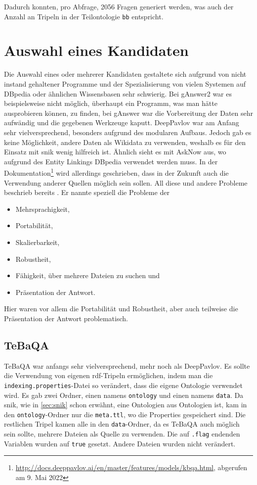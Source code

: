 Dadurch konnten, pro Abfrage, 2056 Fragen generiert werden, was auch der Anzahl an Tripeln in der Teilontologie \texttt{bb} entspricht.

\section{Auswahl eines Kandidaten}

Die Auswahl eines oder mehrerer Kandidaten gestaltete sich aufgrund von nicht instand gehaltener Programme
und der Spezialisierung von vielen Systemen auf DBpedia oder ähnlichen Wissensbasen sehr schwierig.
Bei gAnswer2 war es beispielsweise nicht möglich, überhaupt ein Programm, was man hätte ausprobieren können, zu finden,
bei gAnswer war die Vorbereitung der Daten sehr aufwändig und die gegebenen Werkzeuge kaputt.
DeepPavlov war am Anfang sehr vielversprechend, besonders aufgrund des modularen Aufbaus.
Jedoch gab es keine Möglichkeit, andere Daten als Wikidata zu verwenden, weshalb es für den Einsatz mit \ac{snik} wenig hilfreich ist.
Ähnlich sieht es mit AskNow aus, wo aufgrund des Entity Linkings DBpedia verwendet werden muss.
In der Dokumentation\footnote{\url{http://docs.deeppavlov.ai/en/master/features/models/kbqa.html}, abgerufen am 9. Mai 2022} wird allerdings geschrieben,
dass in der Zukunft auch die Verwendung anderer Quellen möglich sein sollen.
All diese und andere Probleme beschrieb bereits \citet{diefenbachkbqa}.
Er nannte speziell die Probleme der
\begin{itemize}
  \item Mehrsprachigkeit,
  \item Portabilität,
  \item Skalierbarkeit,
  \item Robustheit,
  \item Fähigkeit, über mehrere Dateien zu suchen und
  \item Präsentation der Antwort.
\end{itemize}
Hier waren vor allem die Portabilität und Robustheit, aber auch teilweise die Präsentation der Antwort problematisch.

\subsection{TeBaQA}

TeBaQA war anfangs sehr vielversprechend, mehr noch als DeepPavlov.
Es sollte die Verwendung von eigenen \ac{rdf}-Tripeln ermöglichen, indem man die \texttt{indexing.properties}-Datei so verändert, dass die eigene Ontologie verwendet wird.
Es gab zwei Ordner, einen namens \texttt{ontology} und einen namens \texttt{data}.
Da \ac{snik}, wie in \cref{sec:snik} schon erwähnt, eine Ontologien aus Ontologien ist, kam in den \texttt{ontology}-Ordner nur die \texttt{meta.ttl}, wo die Properties gespeichert sind.
Die restlichen Tripel kamen alle in den \texttt{data}-Ordner, da es TeBaQA auch möglich sein sollte, mehrere Dateien als Quelle zu verwenden.
Die auf \texttt{.flag} endenden Variablen wurden auf \texttt{true} gesetzt.
Andere Dateien wurden nicht verändert.

